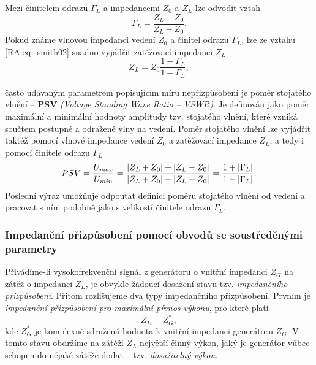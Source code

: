         Mezi činitelem odrazu \(\Gamma_L\) a impedancemi \(Z_0\) a \(Z_L\) lze odvodit vztah
        \begin{equation}\label{RA:eq_smith02}
          \Gamma_L = \frac{Z_L-Z_0}{Z_L-Z_0}.
        \end{equation}    
        Pokud známe vlnovou impedanci vedení \(Z_0\) a činitel odrazu \(\Gamma_L\), lze ze vztahu 
        \ref{RA:eq_smith02} snadno vyjádřit zatěžovací impedanci \(Z_L\)
        \begin{equation}\label{RA:eq_smith03}
          Z_L = Z_0\frac{1+\Gamma_L}{1-\Gamma_L},
        \end{equation}    
  
        často udávaným parametrem popisujícím míru nepřizpůsobení je poměr stojatého vlnění – \textbf{PSV} 
        \emph{(Voltage Standing Wave Ratio – VSWR)}. Je definován jako poměr maximální a minimální hodnoty 
        amplitudy tzv. stojatého vlnění, které vzniká součtem postupné a odražené vlny na vedení. Poměr 
        stojatého vlnění lze vyjádřit taktéž pomocí vlnové impedance vedení \(Z_0\) a zatěžovací impedance 
        \(Z_L\), a tedy i pomocí činitele odrazu \(\Gamma_L\)
        \begin{equation}\label{RA:eq_smith04}
          PSV = \frac{U_{max}}{U_{min}} 
              = \frac{\left\lvert Z_L+Z_0\right\rvert + \left\lvert Z_L-Z_0\right\rvert}{\left\lvert Z_L+Z_0\right\rvert - \left\lvert Z_L-Z_0\right\rvert} 
              = \frac{1+\left\lvert\Gamma_L\right\rvert}{1-\left\lvert\Gamma_L\right\rvert}.
        \end{equation}
        Poslední výraz umožňuje odpoutat definici poměru stojatého vlnění od vedení a pracovat s ním podobně 
        jako s velikostí činitele odrazu \(\Gamma_L\).
      
      \subsubsection{Impedanční přizpůsobení pomocí obvodů se soustředěnými parametry}
        Přivádíme-li vysokofrekvenční signál z generátoru o vnitřní impedanci \(Z_G\) na zátěž o impedanci 
        \(Z_L\), je obvykle žádoucí dosažení stavu tzv. \emph{impedančního přizpůsobení}. Přitom rozlišujeme 
        dva typy impedančního přizpůsobení. Prvním je \emph{impedanční přizpůsobení pro maximální přenos 
        výkonu}, pro které platí
        \begin{equation}\label{RA:eq_smith05}
          Z_L = Z^*_G,
        \end{equation}  
        kde \(Z^*_G\) je komplexně sdružená hodnota k vnitřní impedanci generátoru \(Z_G\). V tomto stavu 
        obdržíme na zátěži \(Z_L\) největší činný výkon, jaký je generátor vůbec schopen do nějaké zátěže 
        dodat – tzv. \emph{dosažitelný výkon}.
  
